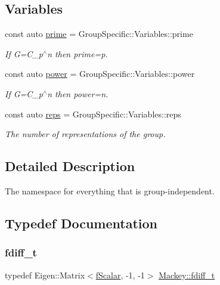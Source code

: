 \subsection*{Variables}
\begin{DoxyCompactItemize}
\item 
const auto \hyperlink{namespaceMackey_a77e059c6f9b4c6ea096fcf94a7880bc3}{prime} = Group\+Specific\+::\+Variables\+::prime
\begin{DoxyCompactList}\small\item\em If G=C\+\_\+p$^\wedge$n then prime=p. \end{DoxyCompactList}\item 
const auto \hyperlink{namespaceMackey_aafdaaabd06dd9ceefe6fa4f26d13a60d}{power} = Group\+Specific\+::\+Variables\+::power
\begin{DoxyCompactList}\small\item\em If G=C\+\_\+p$^\wedge$n then power=n. \end{DoxyCompactList}\item 
const auto \hyperlink{namespaceMackey_af282e8433677f2812cb242359f4cd0c1}{reps} = Group\+Specific\+::\+Variables\+::reps
\begin{DoxyCompactList}\small\item\em The number of representations of the group. \end{DoxyCompactList}\end{DoxyCompactItemize}


\subsection{Detailed Description}
The namespace for everything that is group-\/independent. 

\subsection{Typedef Documentation}
\mbox{\label{namespaceMackey_a0070de220d906e8e603d5ab4c68e7784}} 
\subsubsection{\texorpdfstring{fdiff\+\_\+t}{fdiff\_t}}
{\footnotesize\ttfamily typedef Eigen\+::\+Matrix$<$\hyperlink{namespaceMackey_aa1901d96dd7e8dd384bb01f47a893552}{f\+Scalar}, -\/1, -\/1$>$ \hyperlink{namespaceMackey_a0070de220d906e8e603d5ab4c68e7784}{Mackey\+::fdiff\+\_\+t}}



